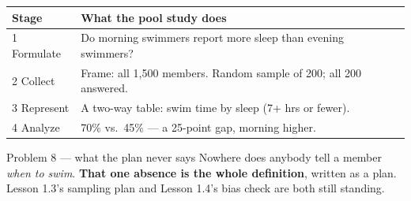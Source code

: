 \documentclass[aspectratio=169, 11pt]{beamer}
\newcommand{\redink}[1]{{\color{redacc}\bfseries #1}}
\begin{document}
\begin{frame}[t, plain]
  \vspace{2pt}
  \begin{center}
    \small
    \renewcommand{\arraystretch}{1.35}
    \begin{tabular}{@{} l l @{}}
    \hline
    \textbf{Stage} & \textbf{What the pool study does} \\
    \hline
    1 Formulate & Do morning swimmers report more sleep than evening swimmers? \\
    2 Collect   & Frame: all 1{,}500 members. Random sample of 200; all 200 answered. \\
    3 Represent & A two-way table: swim time by sleep (7+ hrs or fewer). \\
    4 Analyze   & 70\% vs.\ 45\% --- a 25-point gap, morning higher. \\
    \hline
    \end{tabular}
  \end{center}
  \vspace{8pt}
  \begin{block}{Problem 8 --- what the plan never says}
    Nowhere does anybody tell a member \emph{when to swim}. \redink{That one absence is the
    whole definition}, written as a plan. Lesson 1.3's sampling plan and Lesson 1.4's bias
    check are both still standing.
  \end{block}
\end{frame}
\end{document}
